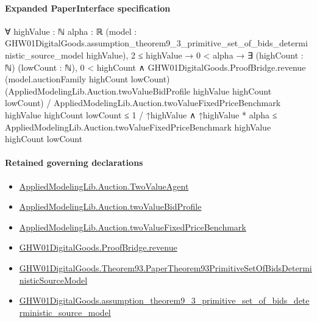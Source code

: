 \documentclass[10pt]{article}
\begin{document}
\paragraph{Expanded PaperInterface specification}
\begin{ReviewVerbatim}
∀ {highValue : ℕ} {alpha : ℝ}
  (model : GHW01DigitalGoods.assumption_theorem9_3_primitive_set_of_bids_deterministic_source_model highValue),
  2 ≤ highValue →
    0 < alpha →
      ∃ (highCount : ℕ) (lowCount : ℕ),
        0 < highCount ∧
          GHW01DigitalGoods.ProofBridge.revenue (model.auctionFamily highCount lowCount)
                  (AppliedModelingLib.Auction.twoValueBidProfile highValue highCount lowCount) /
                AppliedModelingLib.Auction.twoValueFixedPriceBenchmark highValue highCount lowCount ≤
              1 / ↑highValue ∧
            ↑highValue * alpha ≤ AppliedModelingLib.Auction.twoValueFixedPriceBenchmark highValue highCount lowCount
\end{ReviewVerbatim}

\paragraph{Retained governing declarations}
\begin{itemize}\raggedright
\item \hyperlink{governing-declaration-ab987e309e27c460}{Applied\allowbreak{}Modeling\allowbreak{}Lib.\allowbreak{}Auction.\allowbreak{}Two\allowbreak{}Value\allowbreak{}Agent}
\item \hyperlink{governing-declaration-d48f9fc42be39751}{Applied\allowbreak{}Modeling\allowbreak{}Lib.\allowbreak{}Auction.\allowbreak{}two\allowbreak{}Value\allowbreak{}Bid\allowbreak{}Profile}
\item \hyperlink{governing-declaration-88cfb020550f5fda}{Applied\allowbreak{}Modeling\allowbreak{}Lib.\allowbreak{}Auction.\allowbreak{}two\allowbreak{}Value\allowbreak{}Fixed\allowbreak{}Price\allowbreak{}Benchmark}
\item \hyperlink{governing-declaration-270b06609999bd61}{GHW01\allowbreak{}Digital\allowbreak{}Goods.\allowbreak{}Proof\allowbreak{}Bridge.\allowbreak{}revenue}
\item \hyperlink{governing-declaration-db03774cfe7c04c3}{GHW01\allowbreak{}Digital\allowbreak{}Goods.\allowbreak{}Theorem93.\allowbreak{}Paper\allowbreak{}Theorem93\allowbreak{}Primitive\allowbreak{}Set\allowbreak{}Of\allowbreak{}Bids\allowbreak{}Deterministic\allowbreak{}Source\allowbreak{}Model}
\item \hyperlink{governing-declaration-dea40fd3cf7585ce}{GHW01\allowbreak{}Digital\allowbreak{}Goods.\allowbreak{}assumption\_\allowbreak{}theorem9\_\allowbreak{}3\_\allowbreak{}primitive\_\allowbreak{}set\_\allowbreak{}of\_\allowbreak{}bids\_\allowbreak{}deterministic\_\allowbreak{}source\_\allowbreak{}model}
\end{itemize}
\end{document}
